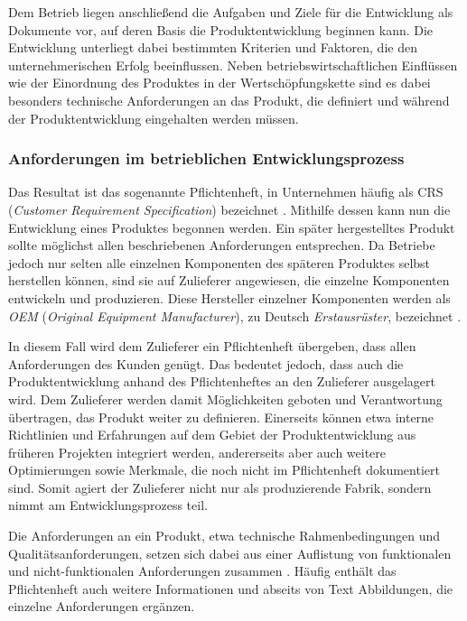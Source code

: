 \documentclass[12pt]{report}
\begin{document}
Dem Betrieb liegen anschließend die Aufgaben und Ziele für die Entwicklung als Dokumente vor, auf deren Basis die Produktentwicklung beginnen kann. Die Entwicklung unterliegt dabei bestimmten Kriterien und Faktoren, die den unternehmerischen Erfolg beeinflussen. Neben betriebswirtschaftlichen Einflüssen wie der Einordnung des Produktes in der Wertschöpfungskette sind es dabei besonders technische Anforderungen an das Produkt, die definiert und während der Produktentwicklung eingehalten werden müssen.

\subsubsection{Anforderungen im betrieblichen Entwicklungsprozess}
Das Resultat ist das sogenannte Pflichtenheft, in Unternehmen häufig als CRS (\textit{Customer Requirement Specification}) bezeichnet \cite{dge19}. Mithilfe dessen kann nun die Entwicklung eines Produktes begonnen werden. Ein später hergestelltes Produkt sollte möglichst allen beschriebenen Anforderungen entsprechen. Da Betriebe jedoch nur selten alle einzelnen Komponenten des späteren Produktes selbst herstellen können, sind sie auf Zulieferer angewiesen, die einzelne Komponenten entwickeln und produzieren. Diese Hersteller einzelner Komponenten werden als \textit{OEM} (\textit{Original Equipment Manufacturer}), zu Deutsch \textit{Erstausrüster}, bezeichnet \cite{ir09}.  

In diesem Fall wird dem Zulieferer ein Pflichtenheft übergeben, dass allen Anforderungen des Kunden genügt. Das bedeutet jedoch, dass auch die Produktentwicklung anhand des Pflichtenheftes an den Zulieferer ausgelagert wird. Dem Zulieferer werden damit Möglichkeiten geboten und Verantwortung übertragen, das Produkt weiter zu definieren. Einerseits können etwa interne Richtlinien und Erfahrungen auf dem Gebiet der Produktentwicklung aus früheren Projekten integriert werden, andererseits aber auch weitere Optimierungen sowie Merkmale, die noch nicht im Pflichtenheft dokumentiert sind. Somit agiert der Zulieferer nicht nur als produzierende Fabrik, sondern nimmt am Entwicklungsprozess teil.

Die Anforderungen an ein Produkt, etwa technische Rahmenbedingungen und Qualitätsanforderungen, setzen sich dabei aus einer Auflistung von funktionalen und nicht-funktionalen Anforderungen zusammen \cite{bal10}. Häufig enthält das Pflichtenheft auch weitere Informationen und abseits von Text Abbildungen, die einzelne Anforderungen ergänzen. 
\end{document}
